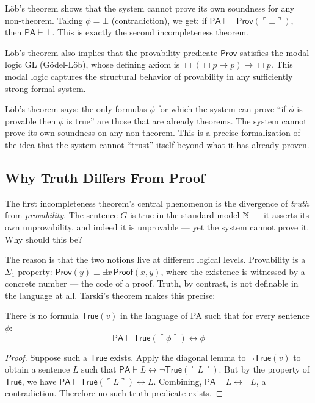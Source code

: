Löb's theorem shows that the system cannot prove its own soundness for any non-theorem. Taking $\phi = \bot$ (contradiction), we get: if $\mathsf{PA} \vdash \neg \mathsf{Prov}(\ulcorner \bot \urcorner)$, then $\mathsf{PA} \vdash \bot$. This is exactly the second incompleteness theorem.

Löb's theorem also implies that the provability predicate $\mathsf{Prov}$ satisfies the modal logic GL (Gödel-Löb), whose defining axiom is $\Box(\Box p \to p) \to \Box p$. This modal logic captures the structural behavior of provability in any sufficiently strong formal system.

Löb's theorem says: the only formulas $\phi$ for which the system can prove ``if $\phi$ is provable then $\phi$ is true'' are those that are already theorems. The system cannot prove its own soundness on any non-theorem. This is a precise formalization of the idea that the system cannot ``trust'' itself beyond what it has already proven.

\subsection{Why Truth Differs From Proof}
\label{sec:godel:truth_vs_proof}

The first incompleteness theorem's central phenomenon is the divergence of \emph{truth} from \emph{provability}. The sentence $G$ is true in the standard model $\mathbb{N}$ --- it asserts its own unprovability, and indeed it is unprovable --- yet the system cannot prove it. Why should this be?

The reason is that the two notions live at different logical levels. Provability is a $\Sigma_1$ property: $\mathsf{Prov}(y) \equiv \exists x\, \mathsf{Proof}(x, y)$, where the existence is witnessed by a concrete number --- the code of a proof. Truth, by contrast, is not definable in the language at all. Tarski's theorem makes this precise:

\begin{theorem}
There is no formula $\mathsf{True}(v)$ in the language of PA such that for every sentence $\phi$:
\[
\mathsf{PA} \vdash \mathsf{True}(\ulcorner \phi \urcorner) \leftrightarrow \phi
\]
\end{theorem}

\begin{proof}
Suppose such a $\mathsf{True}$ exists. Apply the diagonal lemma to $\neg \mathsf{True}(v)$ to obtain a sentence $L$ such that $\mathsf{PA} \vdash L \leftrightarrow \neg \mathsf{True}(\ulcorner L \urcorner)$. But by the property of $\mathsf{True}$, we have $\mathsf{PA} \vdash \mathsf{True}(\ulcorner L \urcorner) \leftrightarrow L$. Combining, $\mathsf{PA} \vdash L \leftrightarrow \neg L$, a contradiction. Therefore no such truth predicate exists.
\end{proof}

